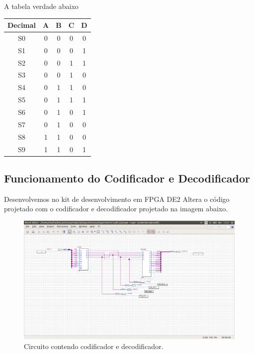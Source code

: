 \documentclass[12pt]{article}
\begin{document}
A tabela verdade abaixo 

\begin{table}[H]
	\centering
	\begin{tabular}{|c|c|c|c|c|}
		\cline{1-5}
		\multicolumn{1}{|c|}{Decimal} & \multicolumn{1}{|c|}{A} & \multicolumn{1}{|c|}{B} & \multicolumn{1}{|c|}{C} & \multicolumn{1}{|c|}{D}\\
		\hline
		S0 & 0 & 0 & 0 & 0 \\
		\hline
		S1 & 0 & 0 & 0 & 1 \\
		\hline
		S2 & 0 & 0 & 1 & 1 \\
		\hline
		S3 & 0 & 0 & 1 & 0 \\
		\hline
		S4 & 0 & 1 & 1 & 0 \\
		\hline
		S5 & 0 & 1 & 1 & 1 \\
		\hline
		S6 & 0 & 1 & 0 & 1 \\
		\hline
		S7 & 0 & 1 & 0 & 0 \\
		\hline
		S8 & 1 & 1 & 0 & 0 \\
		\hline
		S9 & 1 & 1 & 0 & 1 \\
		\hline
	\end{tabular}
	
\end{table} 




\subsection{Funcionamento do Codificador e Decodificador}

Desenvolvemos no kit de desenvolvimento em FPGA DE2 Altera o código projetado com o codificador e decodificador projetado na imagem abaixo. 

\begin{figure}[H]
	\centering
	\includegraphics[width=1\textwidth]{coderdecoder.png}
	\caption{Circuito contendo codificador e decodificador.}
	\label{fig:coderdecoder}
\end{figure}
\end{document}
